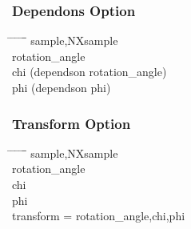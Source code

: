 \documentclass{beamer}
\begin{document}
\begin{frame} \frametitle{Dependons Option}
\begin{tabbing}
\hspace*{1cm} \= \hspace*{1cm} \= \hspace*{1cm} \= \hspace*{1cm} \= \hspace*{1cm} \= \hspace*{1cm}\= \kill
\>sample,NXsample\\
\> \>rotation\_angle\\
\> \>chi (dependson rotation\_angle)\\
\> \>phi (dependson phi)\\
\end{tabbing}
\end{frame}

\begin{frame} \frametitle{Transform Option}
\begin{tabbing}
\hspace*{1cm} \= \hspace*{1cm} \= \hspace*{1cm} \= \hspace*{1cm} \= \hspace*{1cm} \= \hspace*{1cm}\= \kill
\>sample,NXsample\\
\> \>rotation\_angle\\
\> \>chi \\
\> \>phi \\
\> \>transform = rotation\_angle,chi,phi \\
\end{tabbing}
\end{frame}
\end{document}
